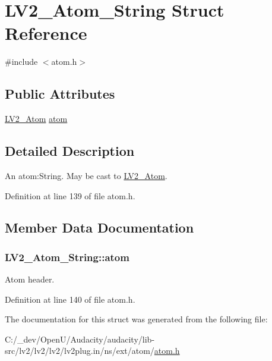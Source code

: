 \hypertarget{struct_l_v2___atom___string}{}\section{L\+V2\+\_\+\+Atom\+\_\+\+String Struct Reference}
\label{struct_l_v2___atom___string}


{\ttfamily \#include $<$atom.\+h$>$}

\subsection*{Public Attributes}
\begin{DoxyCompactItemize}
\item 
\hyperlink{struct_l_v2___atom}{L\+V2\+\_\+\+Atom} \hyperlink{struct_l_v2___atom___string_a425e9fc22f7d04257c6eb6e68bbf84e9}{atom}
\end{DoxyCompactItemize}


\subsection{Detailed Description}
An atom\+:String. May be cast to \hyperlink{struct_l_v2___atom}{L\+V2\+\_\+\+Atom}. 

Definition at line 139 of file atom.\+h.



\subsection{Member Data Documentation}
\subsubsection[{\texorpdfstring{atom}{atom}}]{ L\+V2\+\_\+\+Atom\+\_\+\+String\+::atom}\hypertarget{struct_l_v2___atom___string_a425e9fc22f7d04257c6eb6e68bbf84e9}{}\label{struct_l_v2___atom___string_a425e9fc22f7d04257c6eb6e68bbf84e9}
Atom header. 

Definition at line 140 of file atom.\+h.



The documentation for this struct was generated from the following file\+:\begin{DoxyCompactItemize}
\item 
C\+:/\+\_\+dev/\+Open\+U/\+Audacity/audacity/lib-\/src/lv2/lv2/lv2/lv2plug.\+in/ns/ext/atom/\hyperlink{atom_8h}{atom.\+h}\end{DoxyCompactItemize}
